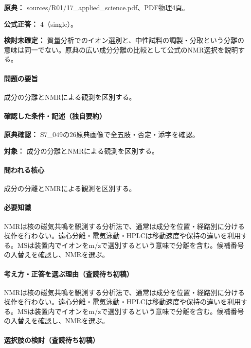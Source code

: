 \noindent\textbf{原典：} sources/R01/17\_applied\_science.pdf、PDF物理4頁。

\textbf{公式正答：} 4（single）。

\par\textbf{検討未確定：} 質量分析でのイオン選別と、中性試料の調製・分取という分離の意味は同一でない。原典の広い成分分離の比較として公式のNMR選択を説明する。

\paragraph{問題の要旨} 成分の分離とNMRによる観測を区別する。

\paragraph{確認した条件・記述（独自要約）}\mbox{}\par

\noindent\textbf{原典確認：} S7\_049の26原典画像で全五肢・否定・添字を確認。\par

\noindent\textbf{対象：} 成分の分離とNMRによる観測を区別する。\par

\paragraph{問われる核心} 成分の分離とNMRによる観測を区別する。

\paragraph{必要知識} NMRは核の磁気共鳴を観測する分析法で、通常は成分を位置・経路別に分ける操作を行わない。遠心分離・電気泳動・HPLCは移動速度や保持の違いを利用する。MSは装置内でイオンをm/zで選別するという意味で分離を含む。候補番号の入替えを確認し、NMRを選ぶ。

\paragraph{考え方・正答を選ぶ理由（査読待ち初稿）} NMRは核の磁気共鳴を観測する分析法で、通常は成分を位置・経路別に分ける操作を行わない。遠心分離・電気泳動・HPLCは移動速度や保持の違いを利用する。MSは装置内でイオンをm/zで選別するという意味で分離を含む。候補番号の入替えを確認し、NMRを選ぶ。

\paragraph{選択肢の検討（査読待ち初稿）}\mbox{}\par

